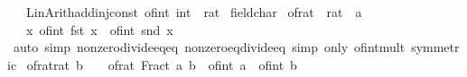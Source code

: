 \begin{isabellebody}
\ \ {\isacharhash}{\kern0pt}{\isachargreater}{\kern0pt}\ Lin{\isacharunderscore}{\kern0pt}Arith{\isachardot}{\kern0pt}add{\isacharunderscore}{\kern0pt}inj{\isacharunderscore}{\kern0pt}const\ {\isacharparenleft}{\kern0pt}\isactrlconstUNDERSCOREname {\isasymopen}of{\isacharunderscore}{\kern0pt}int{\isasymclose}{\isacharcomma}{\kern0pt}\ \isactrltyp {\isasymopen}int\ {\isasymRightarrow}\ rat{\isasymclose}{\isacharparenright}{\kern0pt}{\isacharparenright}{\kern0pt}\isanewline
{\isacartoucheclose}%
\endisatagML
{\isafoldML}%
%
\isadelimML
%
\endisadelimML
%
\isadelimdocument
%
\endisadelimdocument
%
\isatagdocument
%
\isamarkuptrue%
%
\endisatagdocument
{\isafolddocument}%
%
\isadelimdocument
%
\endisadelimdocument
{}\isamarkupfalse%
\ field{\isacharunderscore}{\kern0pt}char{\isacharunderscore}{\kern0pt}{}\isanewline
{}\isanewline
\isanewline
{}\isamarkupfalse%
\ of{\isacharunderscore}{\kern0pt}rat\ {\isacharcolon}{\kern0pt}{\isacharcolon}{\kern0pt}\ {\isachardoublequoteopen}rat\ {\isasymRightarrow}\ {\isacharprime}{\kern0pt}a{\isachardoublequoteclose}\isanewline
\ \ \ {\isachardoublequoteopen}{\isasymlambda}x{\isachardot}{\kern0pt}\ of{\isacharunderscore}{\kern0pt}int\ {\isacharparenleft}{\kern0pt}fst\ x{\isacharparenright}{\kern0pt}\ {\isacharslash}{\kern0pt}\ of{\isacharunderscore}{\kern0pt}int\ {\isacharparenleft}{\kern0pt}snd\ x{\isacharparenright}{\kern0pt}{\isachardoublequoteclose}\isanewline
%
\isadelimproof
\ \ %
\endisadelimproof
%
\isatagproof
{}\isamarkupfalse%
\ {\isacharparenleft}{\kern0pt}auto\ simp{\isacharcolon}{\kern0pt}\ nonzero{\isacharunderscore}{\kern0pt}divide{\isacharunderscore}{\kern0pt}eq{\isacharunderscore}{\kern0pt}eq\ nonzero{\isacharunderscore}{\kern0pt}eq{\isacharunderscore}{\kern0pt}divide{\isacharunderscore}{\kern0pt}eq{\isacharparenright}{\kern0pt}\ {\isacharparenleft}{\kern0pt}simp\ only{\isacharcolon}{\kern0pt}\ of{\isacharunderscore}{\kern0pt}int{\isacharunderscore}{\kern0pt}mult\ {\isacharbrackleft}{\kern0pt}symmetric{\isacharbrackright}{\kern0pt}{\isacharparenright}{\kern0pt}%
\endisatagproof
{\isafoldproof}%
%
\isadelimproof
\isanewline
%
\endisadelimproof
\isanewline
{}\isamarkupfalse%
\isanewline
\isanewline
{}\isamarkupfalse%
\ of{\isacharunderscore}{\kern0pt}rat{\isacharunderscore}{\kern0pt}rat{\isacharcolon}{\kern0pt}\ {\isachardoublequoteopen}b\ {\isasymnoteq}\ {}\ {\isasymLongrightarrow}\ of{\isacharunderscore}{\kern0pt}rat\ {\isacharparenleft}{\kern0pt}Fract\ a\ b{\isacharparenright}{\kern0pt}\ {\isacharequal}{\kern0pt}\ of{\isacharunderscore}{\kern0pt}int\ a\ {\isacharslash}{\kern0pt}\ of{\isacharunderscore}{\kern0pt}int\ b{\isachardoublequoteclose}\isanewline

\end{isabellebody}
